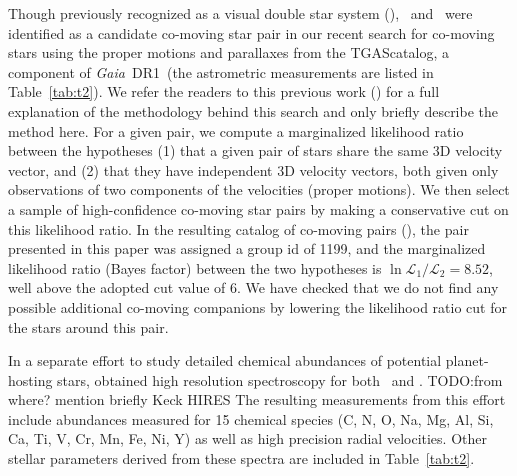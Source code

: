 \documentclass[manuscript]{aastex6}
\newcommand{\project}[1]{\textsl{#1}}
\newcommand{\acronym}[1]{{\small{#1}}}
\newcommand{\gaia}{\project{Gaia}}
\newcommand{\dr}{\acronym{DR1}}
\newcommand{\tgas}{\acronym{TGAS}}
\newcommand{\sunanalog}{\text{Krios}}
\newcommand{\bizarreone}{\text{Kronos}}
\newcommand{\todo}[1]{{\color{blue}TODO:#1}}
\renewcommand\tablename{Table}
\begin{document}
Though previously recognized as a visual double star system
(\citealt{2001AJ....122.3466M}), \sunanalog\ and \bizarreone\ were identified as a
candidate co-moving star pair in our recent search for co-moving stars using the
proper motions and parallaxes from the \tgas catalog, a component of \gaia\ \dr\
(the astrometric measurements are listed in \tablename~\ref{tab:t2}).
We refer the readers to this previous work (\citealt{2016arXiv161202440O}) for a
full explanation of the methodology behind this search and only briefly describe
the method here.
For a given pair, we compute a marginalized likelihood ratio between the
hypotheses (1) that a given pair of stars share the same 3D velocity vector, and
(2) that they have independent 3D velocity vectors, both given only observations
of two components of the velocities (proper motions).
We then select a sample of high-confidence co-moving star pairs by making a
conservative cut on this likelihood ratio.
In the resulting catalog of co-moving pairs (\citealt{2016arXiv161202440O}),
the pair presented in this paper was assigned a group id of 1199,
and the marginalized likelihood ratio (Bayes factor)
between the two hypotheses is $\ln{\mathcal{L}_1/\mathcal{L}_2} = 8.52$,
well above the adopted cut value of 6.
We have checked that we do not find any possible additional co-moving companions
by lowering the likelihood ratio cut for the stars around this pair.

In a separate effort to study detailed chemical abundances of
potential planet-hosting stars, \citet{2016ApJS..225...32B}
obtained high resolution spectroscopy for both \sunanalog\ and \bizarreone.
\todo{from where? mention briefly Keck HIRES}
The resulting measurements from this effort include abundances measured for 15
chemical species (C, N, O, Na, Mg, Al, Si, Ca, Ti, V, Cr, Mn, Fe, Ni, Y) as
well as high precision radial velocities.
Other stellar parameters derived from these spectra are included in
\tablename~\ref{tab:t2}.
\end{document}
